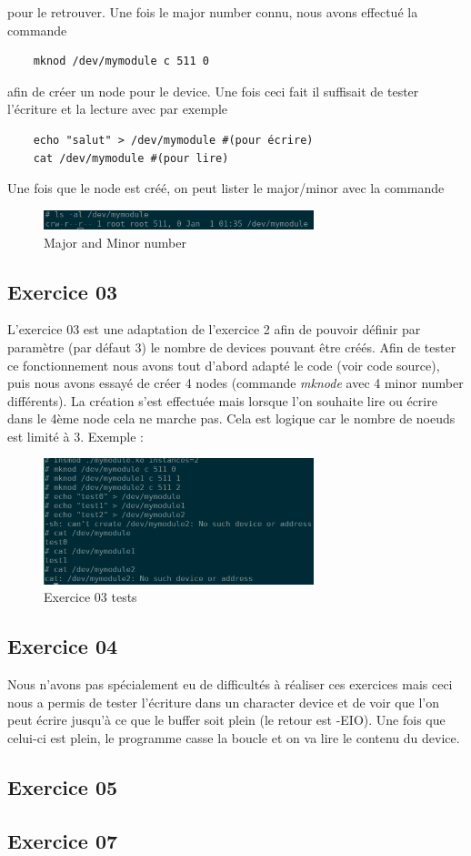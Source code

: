 \documentclass{ReportTemplate}
\begin{document}
pour le retrouver. Une fois le major number connu, nous avons effectué la
commande
\begin{verbatim}
    mknod /dev/mymodule c 511 0
\end{verbatim}
afin de créer un node pour le device. Une fois ceci fait il suffisait de tester
l'écriture et la lecture avec par exemple
\begin{verbatim}
    echo "salut" > /dev/mymodule #(pour écrire)
    cat /dev/mymodule #(pour lire)
\end{verbatim} 
Une fois que le node est créé, on peut lister le major/minor avec la commande 
\begin{figure}[H]
    \centering
    \includegraphics[width=0.7\textwidth]{imageSources/MajorMinor.png}
    \caption{Major and Minor number}
    \label{fig:MajorMinor}
\end{figure}
\newpage
\subsection{Exercice 03}
L'exercice 03 est une adaptation de l'exercice 2 afin de pouvoir définir par
paramètre (par défaut 3) le nombre de devices pouvant être créés. Afin de tester
ce fonctionnement nous avons tout d'abord adapté le code (voir code source),
puis nous avons essayé de créer 4 nodes (commande \textit{mknode} avec 4 minor
number différents). La création s'est effectuée mais lorsque l'on souhaite lire
ou écrire dans le 4ème node cela ne marche pas. Cela est logique car le nombre
de noeuds est limité à 3. Exemple :
\begin{figure}[H]
    \centering
    \includegraphics[width=0.7\textwidth]{imageSources/Ex3_cDev.png}
    \caption{Exercice 03 tests}
    \label{fig:Ex3Tests}
\end{figure}
\subsection{Exercice 04}
Nous n'avons pas spécialement eu de difficultés à réaliser ces exercices mais
ceci nous a permis de tester l'écriture dans un character device et de voir que
l'on peut écrire jusqu'à ce que le buffer soit plein (le retour est -EIO). Une
fois que celui-ci est plein, le programme casse la boucle et on va lire le
contenu du device.
\subsection{Exercice 05}

\subsection{Exercice 07}
\end{document}
